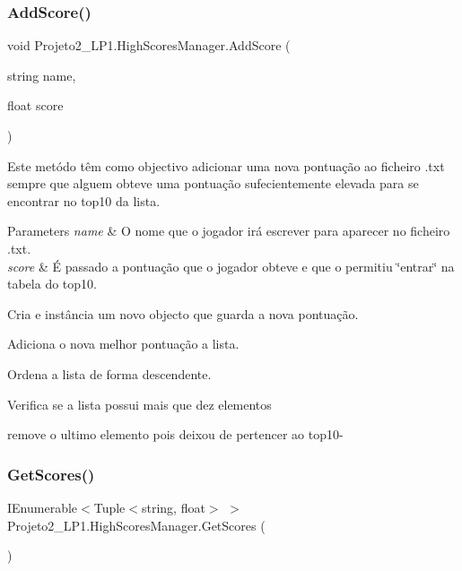 \subsubsection{\texorpdfstring{Add\+Score()}{AddScore()}}
{\footnotesize\ttfamily void Projeto2\+\_\+\+L\+P1.\+High\+Scores\+Manager.\+Add\+Score (\begin{DoxyParamCaption}\item[{string}]{name,  }\item[{float}]{score }\end{DoxyParamCaption})\hspace{0.3cm}{\ttfamily [inline]}}



Este metódo têm como objectivo adicionar uma nova pontuação ao ficheiro .txt sempre que alguem obteve uma pontuação sufecientemente elevada para se encontrar no top10 da lista. 


\begin{DoxyParams}{Parameters}
{\em name} & O nome que o jogador irá escrever para aparecer no ficheiro .txt.\\
\hline
{\em score} & É passado a pontuação que o jogador obteve e que o permitiu \char`\"{}entrar\char`\"{} na tabela do top10.\\
\hline
\end{DoxyParams}
Cria e instância um novo objecto que guarda a nova pontuação.

Adiciona o nova melhor pontuação a lista.

Ordena a lista de forma descendente.

Verifica se a lista possui mais que dez elementos

remove o ultimo elemento pois deixou de pertencer ao top10-\/ \mbox{\label{class_projeto2___l_p1_1_1_high_scores_manager_ac794eb432e647a6daf21db6673a72fa3}} 
\subsubsection{\texorpdfstring{Get\+Scores()}{GetScores()}}
{\footnotesize\ttfamily I\+Enumerable$<$Tuple$<$string, float$>$ $>$ Projeto2\+\_\+\+L\+P1.\+High\+Scores\+Manager.\+Get\+Scores (\begin{DoxyParamCaption}{ }\end{DoxyParamCaption})\hspace{0.3cm}{\ttfamily [inline]}}



